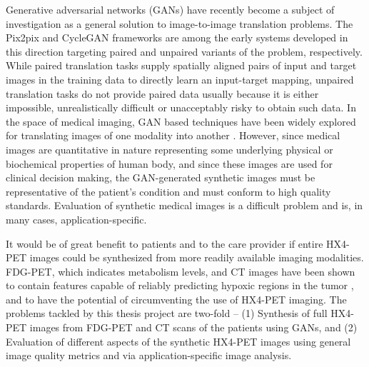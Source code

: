 Generative adversarial networks (GANs) have recently become a subject of investigation as a general solution to image-to-image translation problems. The Pix2pix and CycleGAN frameworks \cite{isola2017image, zhu2017unpaired} are among the early systems developed in this direction targeting paired and unpaired variants of the problem, respectively. While paired translation tasks supply spatially aligned pairs of input and target images in the training data to directly learn an input-target mapping, unpaired translation tasks do not provide paired data usually because it is either impossible, unrealistically difficult or unacceptably risky to obtain such data. In the space of medical imaging, GAN based techniques have been widely explored for translating images of one modality into another \cite{yi2019generative}. However, since medical images are quantitative in nature representing some underlying physical or biochemical properties of human body, and since these images are used for clinical decision making, the GAN-generated synthetic images must be representative of the patient's condition and must conform to high quality standards. Evaluation of synthetic medical images is a difficult problem and is, in many cases, application-specific. 

It would be of great benefit to patients and to the care provider if entire HX4-PET images could be synthesized from more readily available imaging modalities. FDG-PET, which indicates metabolism levels, and CT images have been shown to contain features capable of reliably predicting hypoxic regions in the tumor \cite{even2017predicting, sanduleanu2020non}, and to have the potential of circumventing the use of HX4-PET imaging. The problems tackled by this thesis project are two-fold -- (1) Synthesis of full HX4-PET images from FDG-PET and CT scans of the patients using GANs, and (2) Evaluation of different aspects of the synthetic HX4-PET images using general image quality metrics and via application-specific image analysis.



